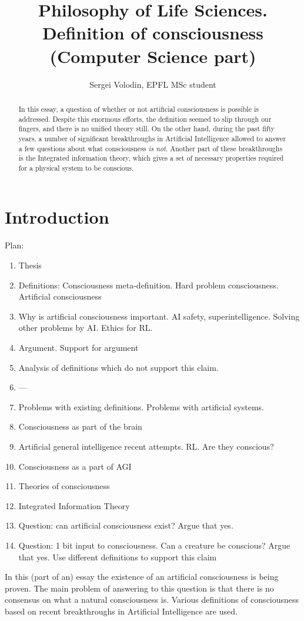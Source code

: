 \documentclass[a4paper]{article}
\title{Philosophy of Life Sciences.\\ Definition of consciousness (Computer Science part)}
\author{Sergei Volodin, EPFL MSc student}
\date{}
\begin{document}
\maketitle

\begin{abstract}
In this essay, a question of whether or not artificial consciousness is possible is addressed.
Despite this enormous efforts, the definition seemed to slip through our fingers, and there is no unified theory still.
On the other hand, during the past fifty years, a number of significant breakthroughs in Artificial Intelligence allowed to answer a few questions about what consciousness {\em is not}.
Another part of these breakthroughs is the Integrated information theory, which gives a set of necessary properties required for a physical system to be conscious.
\end{abstract}

\section{Introduction}
Plan:\begin{enumerate}
\item Thesis
\item Definitions: Consciousness meta-definition. Hard problem consciousness. Artificial consciousness
\item Why is artificial consciousness important. AI safety, superintelligence. Solving other problems by AI. Ethics for RL.
\item Argument. Support for argument
\item Analysis of definitions which do not support this claim.
\item ---
\item Problems with existing definitions. Problems with artificial systems.
\item Consciousness as part of the brain
\item Artificial general intelligence recent attempts. RL. Are they conscious?
\item Consciousness as a part of AGI
\item Theories of consciousness
\item Integrated Information Theory
\item Question: can artificial consciousness exist? Argue that yes.
\item Question: 1 bit input to consciousness. Can a creature be conscious? Argue that yes. Use different definitions to support this claim
\end{enumerate}
In this (part of an) essay the existence of an artificial consciousness is being proven. The main problem of answering to this question is that there is no consensus on what a natural consciousness is. Various definitions of consciousness based on recent breakthroughs in Artificial Intelligence are used.
\end{document}
